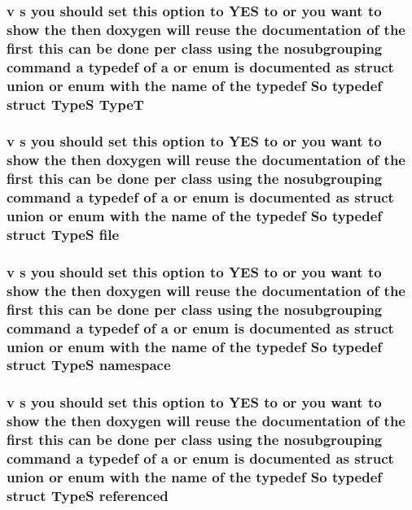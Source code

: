 \hypertarget{mkdoc_8dox_a75f821103190ea93dfc4c1a779ddc9f7}{
\subsubsection[{Type\-T}]{\setlength{\rightskip}{0pt plus 5cm}v s you should set this option to Y\-E\-S to or you want to show the then doxygen will reuse the documentation of the first this can be done per class using the nosubgrouping command a typedef of a or enum is documented as {\bf struct} {\bf union} or enum with the name of the typedef So typedef {\bf struct} {\bf Type\-S}  Type\-T}}\label{mkdoc_8dox_a75f821103190ea93dfc4c1a779ddc9f7}
\hypertarget{mkdoc_8dox_a049a073e5602cc325f7559a06c5a2420}{
\subsubsection[{file}]{\setlength{\rightskip}{0pt plus 5cm}v s you should set this option to Y\-E\-S to or you want to show the then doxygen will reuse the documentation of the first this can be done per class using the nosubgrouping command a typedef of a or enum is documented as {\bf struct} {\bf union} or enum with the name of the typedef So typedef {\bf struct} {\bf Type\-S} file}}\label{mkdoc_8dox_a049a073e5602cc325f7559a06c5a2420}
\hypertarget{mkdoc_8dox_a525af27f938795208a10ce5261c76978}{
\subsubsection[{namespace}]{\setlength{\rightskip}{0pt plus 5cm}v s you should set this option to Y\-E\-S to or you want to show the then doxygen will reuse the documentation of the first this can be done per class using the nosubgrouping command a typedef of a or enum is documented as {\bf struct} {\bf union} or enum with the name of the typedef So typedef {\bf struct} {\bf Type\-S}  namespace}}\label{mkdoc_8dox_a525af27f938795208a10ce5261c76978}
\hypertarget{mkdoc_8dox_ac263f06ace5c014824e336d270a831d2}{
\subsubsection[{referenced}]{\setlength{\rightskip}{0pt plus 5cm}v s you should set this option to Y\-E\-S to or you want to show the then doxygen will reuse the documentation of the first this can be done per class using the nosubgrouping command a typedef of a or enum is documented as {\bf struct} {\bf union} or enum with the name of the typedef So typedef {\bf struct} {\bf Type\-S} referenced}}\label{mkdoc_8dox_ac263f06ace5c014824e336d270a831d2}
